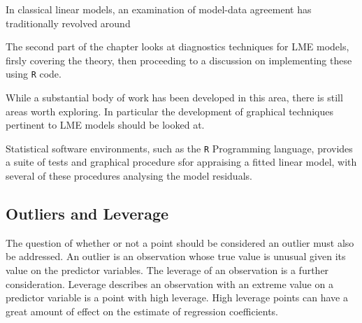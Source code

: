 \documentclass[12pt, a4paper]{article}
\begin{document}
			In classical linear models, an examination of model-data agreement has traditionally revolved around
			
			The second part of the chapter looks at diagnostics techniques for LME models, firsly covering the theory, then proceeding to a discussion on 
			implementing these using \texttt{R} code.
			
			While a substantial body of work has been developed in this area, there is still areas worth exploring. 
			In particular the development of graphical techniques pertinent to LME models should be looked at.
			

			
			
			Statistical software environments, such as the \texttt{R} Programming language, provides a suite of tests and graphical procedure sfor appraising a fitted linear model, with several 
			of these procedures analysing the model residuals.
			
			
			
			
			
			\subsection{Outliers and Leverage}
			
			
			
			The question of whether or not a point should be considered an outlier must also be addressed. An outlier is an observation whose true value is unusual given its value on the predictor variables. The leverage of an observation is a further consideration. Leverage describes an observation with an extreme value on a predictor variable is a point with high leverage. High leverage points can have a great amount of effect on the estimate of regression coefficients.
			
\end{document}
